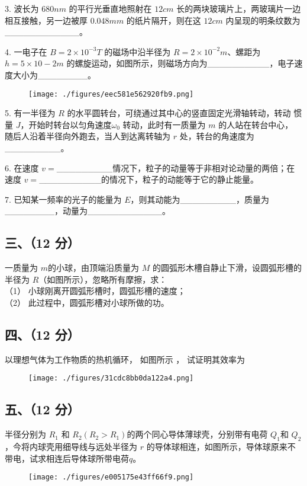 3. 波长为 $680nm$ 的平行光垂直地照射在 $12cm$ 长的两块玻璃片上，两玻璃片一边相互接触，另一边被厚 $0.048mm$ 的纸片隔开，则在这 $12cm$ 内呈现的明条纹数为____________。

4. 一电子在 $B=2\times10^{-3}T$ 的磁场中沿半径为 $R=2\times10^{-2}m$、螺距为 $h=5\times10-2m$ 的螺旋运动，如图所示，则磁场方向为__________，电子速度大小为________。
\begin{figure}[ht]
\centering
\texttt{[image: ./figures/eec581e562920fb9.png]}
\caption{} \label{fig_NJUD4_2}
\end{figure}
5. 有一半径为 $R$ 的水平圆转台，可绕通过其中心的竖直固定光滑轴转动，转动
惯量 $J$，开始时转台以匀角速度$\omega_0$ 转动，此时有一质量为 $m$ 的人站在转台中心，
随后人沿着半径向外跑去，当人到达离转轴为 $r$ 处，转台的角速度为_________。

6. 在速度 $v=$_________情况下，粒子的动量等于非相对论动量的两倍；在速度
$v=$__________的情况下，粒子的动能等于它的静止能量。

7. 已知某一频率的光子的能量为 $E$，则其动能为_________，质量为________，动量为____________。
\subsection{三、（12 分）}
一质量为 $m$的小球，由顶端沿质量为 $M$ 的圆弧形木槽自静止下滑，设圆弧形槽的半径为 $R$（如图所示），忽略所有摩擦，求：\\
（1） 小球刚离开圆弧形槽时，圆弧形槽的速度；\\
（2） 此过程中，圆弧形槽对小球所做的功。
\subsection{四、（12 分）}
以理想气体为工作物质的热机循环， 如图所示 ， 试证明其效率为
\begin{figure}[ht]
\centering
\texttt{[image: ./figures/31cdc8bb0da122a4.png]}
\caption{} \label{fig_NJUD4_3}
\end{figure}
\subsection{五、（12 分）}
半径分别为 $R_1$ 和 $R_2(R_2>R_1)$的两个同心导体薄球壳，分别带有电荷 $Q_1$和 $Q_2$，今将内球壳用细导线与远处半径为 $r$ 的导体球相连，如图所示，导体球原来不带电，试求相连后导体球所带电荷$q$。
\begin{figure}[ht]
\centering
\texttt{[image: ./figures/e005175e43ff66f9.png]}
\caption{} \label{fig_NJUD4_4}
\end{figure}
